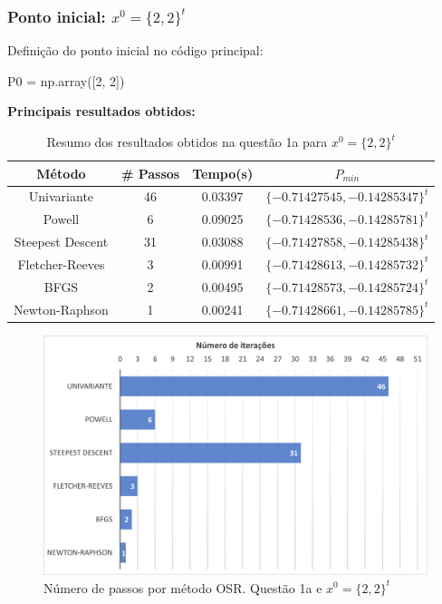 \documentclass[10pt, a4paper]{article}
\begin{document}
\subsubsection{Ponto inicial: $x^0 = \{2,2\}^t $}
Definição do ponto inicial no código principal:
\begin{python}
  P0 = np.array([2, 2])
\end{python}

\vspace{3mm}
\textbf{Principais resultados obtidos: }

\begin{table}[H]
  \begin{center}
    \begin{tabular}{c|c|c|c}
      \textbf{Método} & \textbf{\# Passos} & \textbf{Tempo(s)} & \textbf{$P_{min}$}\\
      \hline
      Univariante & 46 & 0.03397 & $\{-0.71427545, -0.14285347\}^t$\\
      Powell & 6 & 0.09025 & $\{-0.71428536, -0.14285781\}^t$\\
      Steepest Descent & 31 & 0.03088 & $\{-0.71427858, -0.14285438\}^t$\\
      Fletcher-Reeves & 3 & 0.00991 & $\{-0.71428613, -0.14285732\}^t$\\
      BFGS & 2 & 0.00495 & $\{-0.71428573, -0.14285724\}^t$\\
      Newton-Raphson & 1 & 0.00241 & $\{-0.71428661, -0.14285785\}^t$\\
    \end{tabular}
  \end{center}
  \caption{Resumo dos resultados obtidos na questão 1a para $x^0 = \{2,2\}^t$}
\end{table}

\begin{figure}[H]
  \centering
  \includegraphics[scale=0.4]{figuras/q1a_passos_P1.PNG}
  \caption{Número de passos por método OSR. Questão 1a e $x^0 = \{2,2\}^t$ }
\end{figure}
\end{document}
